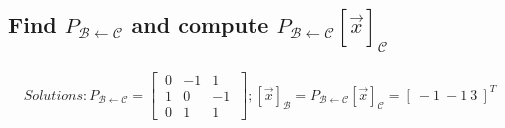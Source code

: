 \documentclass[../main.tex]{subfiles}
\begin{document}
\subsection{Find $P_{\mathcal{B} \leftarrow \mathcal{C}}$ and compute $P_{\mathcal{B} \leftarrow \mathcal{C}}[\vec{x}]_{\mathcal{C}}$}
\begin{align*}
        \boxed{
        Solutions: P_{\mathcal{B} \leftarrow \mathcal{C}} =
        \begin{bmatrix}
                \ 0 & -1 & 1 \  \\
                \ 1 & 0  & -1 \ \\
                \ 0 & 1  & 1  \
        \end{bmatrix}; [\vec{x}]_\mathcal{B} = P_{\mathcal{B} \leftarrow \mathcal{C}}[\vec{x}]_{\mathcal{C}} = [\ -1 \ -1 \ 3\ ]^T
                }
\end{align*}\
\end{document}
